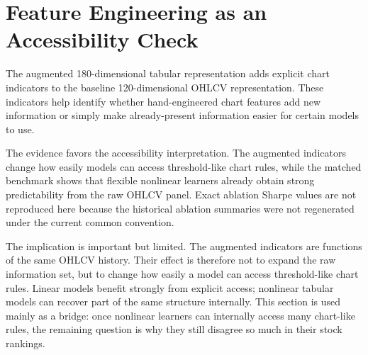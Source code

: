 \section{Feature Engineering as an Accessibility Check}

The augmented 180-dimensional tabular representation adds explicit chart indicators to the baseline 120-dimensional OHLCV representation. These indicators help identify whether hand-engineered chart features add new information or simply make already-present information easier for certain models to use.

The evidence favors the accessibility interpretation. The augmented indicators change how easily models can access threshold-like chart rules, while the matched benchmark shows that flexible nonlinear learners already obtain strong predictability from the raw OHLCV panel. Exact ablation Sharpe values are not reproduced here because the historical ablation summaries were not regenerated under the current common convention.



The implication is important but limited. The augmented indicators are functions of the same OHLCV history. Their effect is therefore not to expand the raw information set, but to change how easily a model can access threshold-like chart rules. Linear models benefit strongly from explicit access; nonlinear tabular models can recover part of the same structure internally. This section is used mainly as a bridge: once nonlinear learners can internally access many chart-like rules, the remaining question is why they still disagree so much in their stock rankings.
